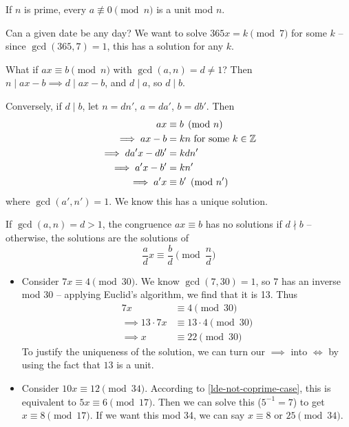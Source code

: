 \documentclass{../../template/note}
\begin{document}
    \begin{corollary}
        If \(n\) is prime, every \(a \not\equiv 0 \pmod n\) is a unit mod \(n\).
    \end{corollary}

    \begin{example}
        Can a given date be any day? We want to solve \(365x = k \pmod 7\) for some \(k\) -- since \(\gcd(365, 7) = 1\), this has a solution for any \(k\).
    \end{example}
    What if \(ax \equiv b \pmod n\) with \(\gcd(a, n) = d \neq 1\)? Then \(n \mid ax - b \implies d \mid ax - b\), and \(d \mid a\), so \(d \mid b\).

    Conversely, if \(d \mid b\), let \(n = dn'\), \(a = da'\), \(b = db'\). Then
    \begin{align*}
        ax &\equiv b \pmod n \\
        \implies ax - b &= kn \text{ for some } k \in \mathbb Z \\
        \implies da'x - db' &= kdn' \\
        \implies a'x - b' &= kn' \\
        \implies a'x &\equiv b' \pmod{n'}
    \end{align*}
    where \(\gcd(a', n') = 1\). We know this has a unique solution.

    \begin{proposition}
        If \(\gcd(a, n) = d > 1\), the congruence \(ax \equiv b\) has no solutions if \(d \nmid b\) -- otherwise, the solutions are the solutions of
        \[
            \frac{a}{d}x \equiv \frac{b}{d} \pmod{\frac{n}{d}}
        \]
        \label{lde-not-coprime-case}
    \end{proposition}
    
    \begin{example}
        \begin{itemize}
            \item Consider \(7x \equiv 4 \pmod {30}\). We know \(\gcd(7, 30) = 1\), so \(7\) has an inverse mod \(30\) -- applying Euclid's algorithm, we find that it is 13. Thus
            \begin{align*}
                7x &\equiv 4 \pmod {30} \\
                \implies 13 \cdot 7x &\equiv 13 \cdot 4 \pmod {30} \\
                \implies x &\equiv 22 \pmod {30}
            \end{align*}
            To justify the uniqueness of the solution, we can turn our \(\implies\) into \(\iff\) by using the fact that \(13\) is a unit.
            \item Consider \(10x \equiv 12 \pmod {34}\). According to \cref{lde-not-coprime-case}, this is equivalent to \(5x \equiv 6 \pmod {17}\). Then we can solve this (\(5^{-1} = 7\)) to get \(x \equiv 8 \pmod {17}\). If we want this mod 34, we can say \(x \equiv 8\) or \(25 \pmod {34}\).
        \end{itemize}
    \end{example}
    
\end{document}
